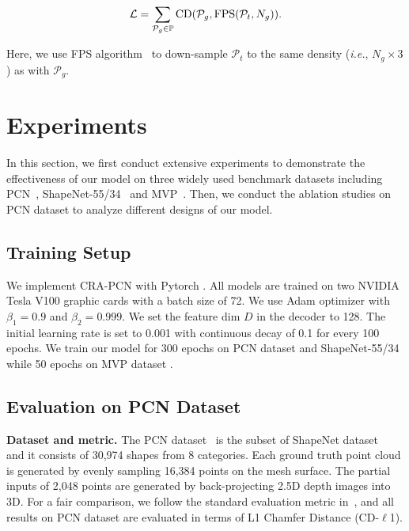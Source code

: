 \documentclass[letterpaper]{article} %
\begin{document}
\begin{equation}
\mathcal L = \sum_{{\mathcal P}_g \in \mathbb P} {\rm CD}({\mathcal P}_g, {\rm FPS}({\mathcal P}_t, N_g)).
\end{equation}\label{eqt:cd}

{\noindent}Here, we use FPS algorithm~\cite{qi2017pointnet++} to down-sample ${\mathcal P}_t$ to the same density ({\em i.e.},  $N_g \times 3$) as with ${\mathcal P}_g$.

\section{Experiments}
In this section, we first conduct extensive experiments to demonstrate the effectiveness of our model on three widely used benchmark datasets including PCN~\cite{yuan2018pcn}, ShapeNet-55/34~\cite{yu2021pointr} and MVP~\cite{pan2021multi}.
Then, we conduct the ablation studies on PCN dataset to analyze different designs of our model.


\subsection {Training Setup}
We implement CRA-PCN with Pytorch \cite{paszke2019pytorch}.
All  models are trained on two NVIDIA Tesla V100 graphic cards with a batch size of 72. We use Adam  optimizer \cite{kingma2014adam} with $\beta_1 = 0.9$ and $\beta_2 = 0.999$.
We set the feature dim $D$ in the decoder to 128.
The initial learning rate is set to 0.001 with continuous decay of 0.1 for every 100 epochs.
We train our model for 300 epochs on PCN dataset \cite{yuan2018pcn}  and ShapeNet-55/34  \cite{yu2021pointr}  while 50 epochs on MVP dataset \cite{pan2021multi}.

\subsection{Evaluation on PCN Dataset}
{\bf Dataset and metric.}
The PCN dataset~\cite{yuan2018pcn} is the subset of ShapeNet dataset~\cite{chang2015shapenet} and it consists of 30,974 shapes from 8 categories.
Each ground truth point cloud is generated by evenly sampling 16,384 points on the mesh surface.
The partial inputs of 2,048 points are generated by back-projecting 2.5D depth images into 3D.
For a fair comparison, we follow the standard evaluation metric in~\cite{yuan2018pcn}, and all results on PCN dataset are evaluated in terms of L1 Chamfer Distance (CD-$\ell$1).
\end{document}
